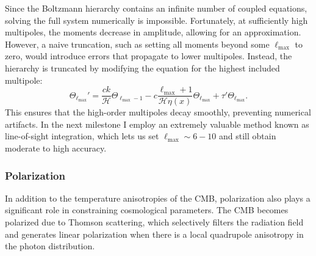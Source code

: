 \documentclass{aa}
\numberwithin{equation}{section}
\numberwithin{table}{section}
\numberwithin{figure}{section}
\begin{document}
Since the Boltzmann hierarchy contains an infinite number of coupled equations, solving the full system numerically is impossible. Fortunately, at sufficiently high multipoles, the moments decrease in amplitude, allowing for an approximation. However, a naive truncation, such as setting all moments beyond some $\ell_{\max}$ to zero, would introduce errors that propagate to lower multipoles. Instead, the hierarchy is truncated by modifying the equation for the highest included multipole:
\begin{equation} 
  \Theta_{\ell_{\max}}' = \frac{ck}{\mathcal{H}} \Theta_{\ell_{\max}-1} - c \frac{\ell_{\max}+1}{\mathcal{H} \eta(x)} \Theta_{\ell_{\max}} + \tau' \Theta_{\ell_{\max}}. 
\end{equation}
This ensures that the high-order multipoles decay smoothly, preventing numerical artifacts. In the next milestone I employ an extremely valuable method known as line-of-sight integration, which lets us set $\ell_{\max} \sim 6-10$ and still obtain moderate to high accuracy.


\subsubsection{Polarization}\label{subsubsec: III theory pol}
In addition to the temperature anisotropies of the CMB, polarization also plays a significant role in constraining cosmological parameters. The CMB becomes polarized due to Thomson scattering, which selectively filters the radiation field and generates linear polarization when there is a local quadrupole anisotropy in the photon distribution.
\end{document}
